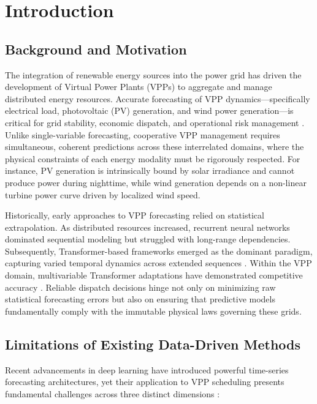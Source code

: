 \section{Introduction}

\subsection{Background and Motivation}
The integration of renewable energy sources into the power grid has driven the development of Virtual Power Plants (VPPs) to aggregate and manage distributed energy resources. Accurate forecasting of VPP dynamics---specifically electrical load, photovoltaic (PV) generation, and wind power generation---is critical for grid stability, economic dispatch, and operational risk management \cite{Ma2025,Cao2023,Qiu2024,Moreno2020,Wu2024}. Unlike single-variable forecasting, cooperative VPP management requires simultaneous, coherent predictions across these interrelated domains, where the physical constraints of each energy modality must be rigorously respected. For instance, PV generation is intrinsically bound by solar irradiance and cannot produce power during nighttime, while wind generation depends on a non-linear turbine power curve driven by localized wind speed. 

Historically, early approaches to VPP forecasting relied on statistical extrapolation. As distributed resources increased, recurrent neural networks dominated sequential modeling but struggled with long-range dependencies. Subsequently, Transformer-based frameworks emerged as the dominant paradigm, capturing varied temporal dynamics across extended sequences \cite{Zhou2021informer,Wu2021autoformer,Nie2023patchtst,Zeng2023}. Within the VPP domain, multivariable Transformer adaptations have demonstrated competitive accuracy \cite{Qiu2024,Ashraf2025}. Reliable dispatch decisions hinge not only on minimizing raw statistical forecasting errors but also on ensuring that predictive models fundamentally comply with the immutable physical laws governing these grids.

\subsection{Limitations of Existing Data-Driven Methods}
Recent advancements in deep learning have introduced powerful time-series forecasting architectures, yet their application to VPP scheduling presents fundamental challenges across three distinct dimensions \cite{Vle2025,Arabzadeh2025}:

